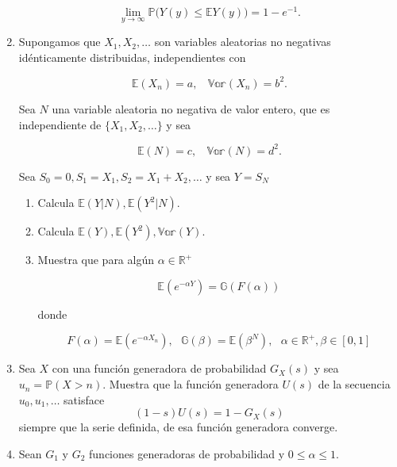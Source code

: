 \documentclass[a4paper,11pt]{report}
\begin{document}
\begin{enumerate}
\[
\lim_{y \rightarrow \infty}\mathbb{P}\bigr(Y(y)\leq \mathbb{E}Y(y) \bigl) = 1 -e^{-1}.
\]
\item Supongamos que $X_1, X_2, \dots$ son variables aleatorias no negativas id\'enticamente distribuidas, independientes con

\[
\mathbb{E}(X_n) = a, \ \ \ \ \mathbb{Var}(X_n) = b^2.
\]

Sea $N$ una variable aleatoria no negativa de valor entero, que es independiente de $\{ X_1, X_2, \dots\}$ y sea 

\[
\mathbb{E}(N) = c, \ \ \ \ \mathbb{Var}(N) = d^2.
\]

\vspace{0.2cm}

Sea $S_0 = 0, S_1 = X_1, S_2 = X_1 + X_2, \dots $ y sea $Y = S_N$

\begin{enumerate}
	\item Calcula $\mathbb{E}(Y|N), \mathbb{E}(Y^2|N)$.
	\item Calcula $\mathbb{E}(Y), \mathbb{E}(Y^2), \mathbb{Var}(Y)$.
	\item Muestra que para alg\'un $\alpha \in \mathbb{R^{+}}$
	
	\[
	\mathbb{E}(e^{-\alpha Y}) = \mathbb{G}(F(\alpha))
	\]
	
	\vspace{0.2cm}
	
	donde
	
	\vspace{0.2cm}
	
	\[
	F(\alpha) = \mathbb{E}(e^{-\alpha X_n}), \ \ \ \mathbb{G}(\beta) = \mathbb{E}(\beta^N), \ \ \ \alpha \in \mathbb{R^{+}}, \beta \in [0,1]
	\]
\end{enumerate}
\item Sea $X$ con una funci\'on generadora de probabilidad $G_{X}(s)$ y sea $u_n = \mathbb{P}(X > n)$. Muestra que la funci\'on generadora $U(s)$ de la secuencia $u_0, u_1, \dots$ satisface
\[
(1 -s)U(s) = 1 -G_{X}(s)
\]
siempre que la serie definida, de esa funci\'on generadora converge.

\item Sean $G_1$ y $G_2$ funciones generadoras de probabilidad y $0 \leq \alpha \leq 1$. 


\end{enumerate}
\end{document}
